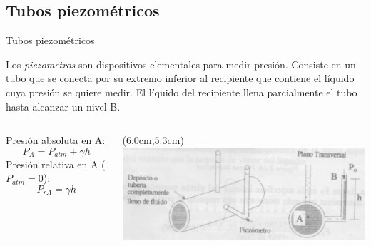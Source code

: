 \documentclass [xcolor=svgnames, t] {beamer}
\begin{document}
\subsection{Tubos piezom\'etricos}
\begin{frame}{Tubos piezom\'etricos}
\begin{block}{}
Los \emph{piezometros} son dispositivos elementales para medir presi\'on. Consiste en un tubo que se conecta por su extremo inferior al recipiente que contiene el l\'iquido cuya presi\'on se quiere medir. El l\'iquido del recipiente llena parcialmente el tubo hasta alcanzar un nivel B.
\end{block}
\begin{columns}
Presi\'on absoluta en A:
$$
P_A = P_{atm}+\gamma h
$$
Presi\'on relativa en A ($P_{atm}=0$):
$$
P_{rA} = \gamma h
$$
\begin{textblock*}{5.5cm}(6.0cm,5.3cm) %
\includegraphics[width=1.2\textwidth]{piezo}
\end{textblock*}
\end{columns}
\end{frame}
\end{document}
